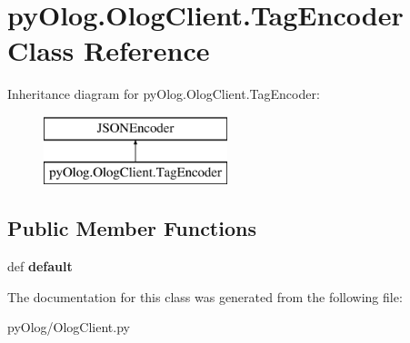 \hypertarget{classpyOlog_1_1OlogClient_1_1TagEncoder}{\section{py\-Olog.\-Olog\-Client.\-Tag\-Encoder Class Reference}
\label{classpyOlog_1_1OlogClient_1_1TagEncoder}
}
Inheritance diagram for py\-Olog.\-Olog\-Client.\-Tag\-Encoder\-:\begin{figure}[H]
\begin{center}
\leavevmode
\includegraphics[height=2.000000cm]{classpyOlog_1_1OlogClient_1_1TagEncoder}
\end{center}
\end{figure}
\subsection*{Public Member Functions}
\begin{DoxyCompactItemize}
\item 
\hypertarget{classpyOlog_1_1OlogClient_1_1TagEncoder_a281c9c5b9da05bc6301a7ad8efe63d30}{def {\bfseries default}}\label{classpyOlog_1_1OlogClient_1_1TagEncoder_a281c9c5b9da05bc6301a7ad8efe63d30}

\end{DoxyCompactItemize}


The documentation for this class was generated from the following file\-:\begin{DoxyCompactItemize}
\item 
py\-Olog/Olog\-Client.\-py\end{DoxyCompactItemize}
